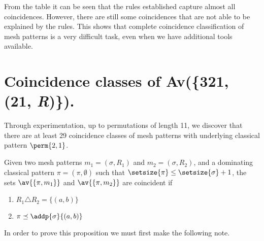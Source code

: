 From the table it can be seen that the rules established capture almost all
coincidences. However, there are still some coincidences that are not able to
be explained by the rules. This shows that complete coincidence classification
of mesh patterns is a very difficult task, even when we have additional tools
available.
\section{Coincidence classes of Av(\{321, (21, \textit{R})\}).}
Through experimentation, up to permutations of length 11, we discover that there
are at least 29 coincidence classes of mesh patterns with underlying classical
pattern \(\perm{2,1}\).

\begin{proposition}
    \label{prop:dom1}
    Given two mesh patterns \(m_1 =(\sigma, R_1)\) and \(m_2 = (\sigma, R_2)\),
    and a dominating classical pattern \(\pi = (\pi,\emptyset)\) such that
    \(\setsize{\pi} \le \setsize{\sigma} + 1\), the sets \(\av{\{\pi,m_1\}}\) and
    \(\av{\{\pi,m_2\}}\) are coincident if

    \begin{enumerate}
        \item \(R_1 \triangle R_2 = \{(a,b)\}\)
        \item \(\pi \preceq \addp{\sigma}{(a,b)}\)\label{prop:dom1:cont}
    \end{enumerate}
\end{proposition}
In order to prove this proposition we must first make the following note.

